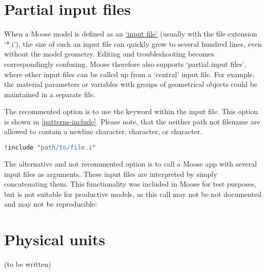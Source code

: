 \section{Partial input files}
\label{chap:patterns-partial-input-files}

When a Moose model is defined as an
\href{https://mooseframework.inl.gov/application_usage/input_syntax.html}{‘input
    file’} (usually with the file extension ‘*.i’), the size of such an input file
can quickly grow to several hundred lines, even without the model geometry.
Editing and troubleshooting becomes correspondingly confusing. Moose therefore
also supports ‘partial input files’, where other input files can be called up
from a ‘central’ input file. For example, the material parameters or variables
with groups of geometrical objects could be maintained in a separate file.

The recommented option is to use the  keyword within the
input file. This option is shown in \autoref{patterns-include}. Please note,
that the neither path not filename are allowed to contain a newline character,
\codeword{#} character, or \codeword{[} character.

\begin{lstlisting}[language=perl, caption={Include anpther input file},label={patterns-include}]
!include "path/to/file.i"
\end{lstlisting}

The alternative and not recommented option is to call a Moose app with several
input files as arguments. These input files are interpreted by simply
concatenating them. This functionality was included in Moose for test purposes,
but is not suitable for productive models, as this call may not be not
documented and may not be reproducible:


\section{Physical units}
\label{chap:patterns-physical units}

(to be written)

